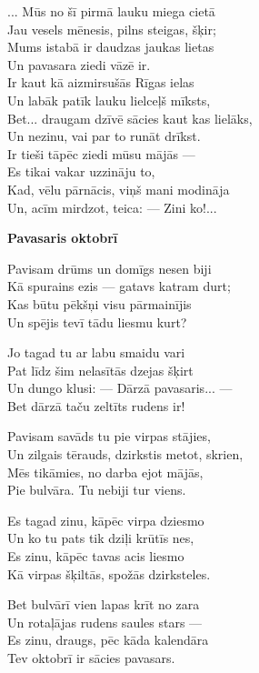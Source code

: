 \documentclass[11pt]{article}
\begin{document}
{... Mūs no šī pirmā lauku miega cietā\\
Jau vesels mēnesis, pilns steigas, šķir;\\
Mums istabā ir daudzas jaukas lietas\\
Un pavasara ziedi vāzē ir.\\
Ir kaut kā aizmirsušās Rīgas ielas\\
Un labāk patīk lauku lielceļš mīksts,\\
Bet... draugam dzīvē sācies kaut kas lielāks,\\
Un nezinu, vai par to runāt drīkst.\\
Ir tieši tāpēc ziedi mūsu mājās ---\\
Es tikai vakar uzzināju to,\\
Kad, vēlu pārnācis, viņš mani modināja\\
Un, acīm mirdzot, teica: --- Zini ko!...



\newpage

{\bf Pavasaris oktobrī}

Pavisam drūms un domīgs nesen biji\\
Kā spurains ezis --- gatavs katram durt;\\
Kas būtu pēkšņi visu pārmainījis\\
Un spējis tevī tādu liesmu kurt?

Jo tagad tu ar labu smaidu vari\\
Pat līdz šim nelasītās dzejas šķirt\\
Un dungo klusi: --- Dārzā pavasaris... ---\\
Bet dārzā taču zeltīts rudens ir!

Pavisam savāds tu pie virpas stājies,\\
Un zilgais tērauds, dzirkstis metot, skrien,\\
Mēs tikāmies, no darba ejot mājās,\\
Pie bulvāra. Tu nebiji tur viens.

Es tagad zinu, kāpēc virpa dziesmo\\
Un ko tu pats tik dziļi krūtīs nes,\\
Es zinu, kāpēc tavas acis liesmo\\
Kā virpas šķiltās, spožās dzirksteles.

Bet bulvārī vien lapas krīt no zara\\
Un rotaļājas rudens saules stars ---\\
Es zinu, draugs, pēc kāda kalendāra\\
Tev oktobrī ir sācies pavasars.

}
\end{document}
